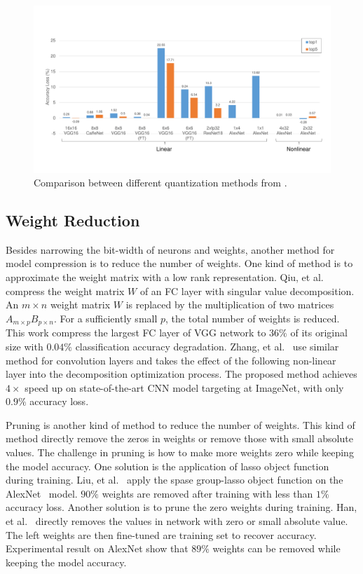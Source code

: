 \begin{figure}[h]
    \centering
    \includegraphics[width=1.0\columnwidth]{fig/quantization.pdf}
    \caption{Comparison between different quantization methods from \cite{qiu2016going, guo2017angel, han2015deep, zhu2016trained, zhou2016dorefa, li2016ternary}.}
    \label{fig:quantization}
\end{figure}

\subsection{Weight Reduction}
Besides narrowing the bit-width of neurons and weights, another method for model compression is to reduce the number of weights. One kind of method is to approximate the weight matrix with a low rank representation. Qiu, et al.~\cite{qiu2016going} compress the weight matrix $W$ of an FC layer with singular value decomposition. An $m\times n$ weight matrix $W$ is replaced by the multiplication of two matrices $A_{m\times p}B_{p\times n}$. For a sufficiently small $p$, the total number of weights is reduced. This work compress the largest FC layer of VGG network to $36\%$ of its original size with $0.04\%$ classification accuracy degradation. Zhang, et al.~\cite{zhang2015efficient} use similar method for convolution layers and takes the effect of the following non-linear layer into the decomposition optimization process. The proposed method achieves $4\times$ speed up on state-of-the-art CNN model targeting at ImageNet, with only $0.9\%$ accuracy loss.

Pruning is another kind of method to reduce the number of weights. This kind of method directly remove the zeros in weights or remove those with small absolute values. The challenge in pruning is how to make more weights zero while keeping the model accuracy. One solution is the application of lasso object function during training. Liu, et al.~\cite{liu2015sparse} apply the spase group-lasso object function on the AlexNet~\cite{krizhevsky2012imagenet} model. $90\%$ weights are removed after training with less than $1\%$ accuracy loss. Another solution is to prune the zero weights during training. Han, et al.~\cite{han2015deep} directly removes the values in network with zero or small absolute value. The left weights are then fine-tuned are training set to recover accuracy. Experimental result on AlexNet show that $89\%$ weights can be removed while keeping the model accuracy.